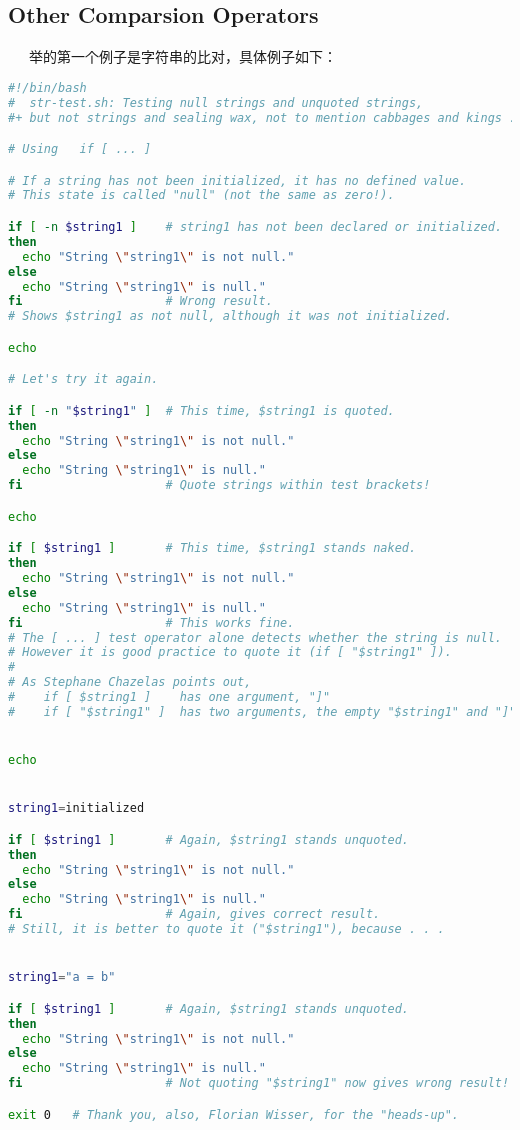 \documentclass[12pt]{article}  %
\begin{document}
\subsection{Other Comparsion Operators}
\ \ \ 举的第一个例子是字符串的比对，具体例子如下：
\begin{lstlisting}[language=sh]
#!/bin/bash
#  str-test.sh: Testing null strings and unquoted strings,
#+ but not strings and sealing wax, not to mention cabbages and kings . . .

# Using   if [ ... ]

# If a string has not been initialized, it has no defined value.
# This state is called "null" (not the same as zero!).

if [ -n $string1 ]    # string1 has not been declared or initialized.
then
  echo "String \"string1\" is not null."
else  
  echo "String \"string1\" is null."
fi                    # Wrong result.
# Shows $string1 as not null, although it was not initialized.

echo

# Let's try it again.

if [ -n "$string1" ]  # This time, $string1 is quoted.
then
  echo "String \"string1\" is not null."
else  
  echo "String \"string1\" is null."
fi                    # Quote strings within test brackets!

echo

if [ $string1 ]       # This time, $string1 stands naked.
then
  echo "String \"string1\" is not null."
else  
  echo "String \"string1\" is null."
fi                    # This works fine.
# The [ ... ] test operator alone detects whether the string is null.
# However it is good practice to quote it (if [ "$string1" ]).
#
# As Stephane Chazelas points out,
#    if [ $string1 ]    has one argument, "]"
#    if [ "$string1" ]  has two arguments, the empty "$string1" and "]" 


echo


string1=initialized

if [ $string1 ]       # Again, $string1 stands unquoted.
then
  echo "String \"string1\" is not null."
else  
  echo "String \"string1\" is null."
fi                    # Again, gives correct result.
# Still, it is better to quote it ("$string1"), because . . .


string1="a = b"

if [ $string1 ]       # Again, $string1 stands unquoted.
then
  echo "String \"string1\" is not null."
else  
  echo "String \"string1\" is null."
fi                    # Not quoting "$string1" now gives wrong result!

exit 0   # Thank you, also, Florian Wisser, for the "heads-up".
\end{lstlisting}\par
\end{document}
